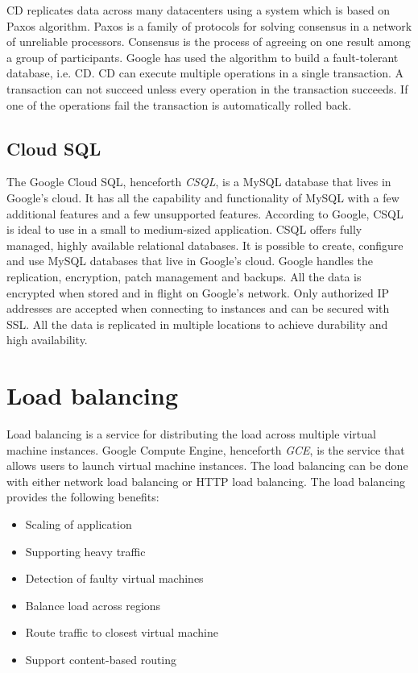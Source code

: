 \documentclass[11pt]{report}
\begin{document}
CD replicates data across many datacenters using a system which is based on Paxos algorithm. Paxos is a family of protocols for solving consensus in a network of unreliable processors. Consensus is the process of agreeing on one result among a group of participants. Google has used the algorithm to build a fault-tolerant database, i.e. CD. CD can execute multiple operations in a single transaction. A transaction can not succeed unless every operation in the transaction succeeds. If one of the operations fail the transaction is automatically rolled back.

\subsection{Cloud SQL}
The Google Cloud SQL, henceforth \emph{CSQL}, is a MySQL database that lives in Google's cloud. It has all the capability and functionality of MySQL with a few additional features and a few unsupported features. According to Google, CSQL is ideal to use in a small to medium-sized application. CSQL offers fully managed, highly available relational databases. It is possible to create, configure and use MySQL databases that live in Google's cloud. Google handles the replication, encryption, patch management and backups. All the data is encrypted when stored and in flight on Google's network. Only authorized IP addresses are accepted when connecting to instances and can be secured with SSL. All the data is replicated in multiple locations to achieve durability and high availability.

\section{Load balancing}
Load balancing is a service for distributing the load across multiple virtual machine instances. Google Compute Engine, henceforth \emph{GCE}, is the service that allows users to launch virtual machine instances. The load balancing can be done with either network load balancing or HTTP load balancing. The load balancing provides the following benefits:

\begin{itemize}
\item Scaling of application
\item Supporting heavy traffic
\item Detection of faulty virtual machines
\item Balance load across regions
\item Route traffic to closest virtual machine
\item Support content-based routing
\end{itemize}
\end{document}
